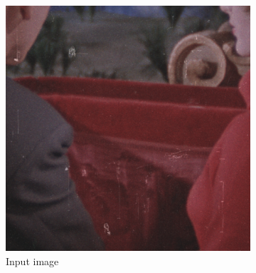 \begin{figure}[H]
	\centering
	\begin{subfigure}{.3\textwidth}
		\centering
		\includegraphics[width=\linewidth]{introduction/input_save.png}
		\caption[figure]{Input image}
		\label{fig:intro_flow1}
	\end{subfigure}
	\begin{subfigure}{.3\textwidth}
		\centering
		\setlength{\fboxrule}{0.5pt}
        \setlength{\fboxsep}{0pt}

\end{subfigure}
\end{figure}
